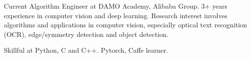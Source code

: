 

\begin{cvparagraph}
Current Algorithm Engineer at DAMO Academy, Alibaba Group. 3+ years experience in computer vision and deep learning. Research interest involves algorithms and applications in computer vision, especially optical text recognition (OCR), edge/symmetry detection and object detection. 

Skillful at Python, C and C++. Pytorch, Caffe learner. 

\end{cvparagraph}
